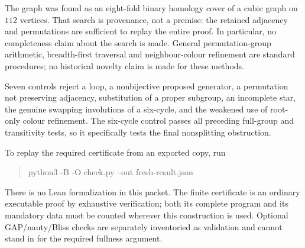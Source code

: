 \documentclass[11pt,a4paper]{article}
\begin{document}
The graph was found as an eight-fold binary homology cover of a cubic graph
on $112$ vertices.  That search is provenance, not a premise: the retained
adjacency and permutations are sufficient to replay the entire proof.
In particular, no completeness claim about the search is made.  General
permutation-group arithmetic, breadth-first traversal and neighbour-colour
refinement are standard procedures; no historical novelty claim is made
for these methods.

Seven controls reject a loop, a nonbijective proposed generator, a
permutation not preserving adjacency, substitution of a proper subgroup,
an incomplete star, the genuine swapping involutions of a six-cycle, and
the weakened use of root-only colour refinement.  The six-cycle control
passes all preceding full-group and transitivity tests, so it specifically
tests the final nonsplitting obstruction.

To replay the required certificate from an exported copy, run
\begin{quote}\ttfamily\small
python3 -B -O check.py --out fresh-result.json
\end{quote}
There is no Lean formalization in this packet.  The finite certificate is
an ordinary executable proof by exhaustive verification; both its complete
program and its mandatory data must be counted wherever this construction
is used.  Optional GAP/nauty/Bliss checks are separately inventoried as
validation and cannot stand in for the required fullness argument.
\end{document}
